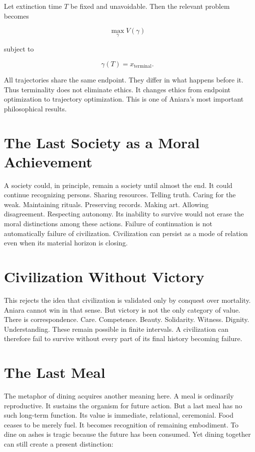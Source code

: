 \documentclass[11pt,oneside]{book}
\theoremstyle{definition}
\theoremstyle{remark}
\begin{document}
Let extinction time \(T\) be fixed and unavoidable. Then the relevant problem becomes

\[
\max_{\gamma} V(\gamma)
\]

subject to

\[
\gamma(T)=x_{\mathrm{terminal}}.
\]

All trajectories share the same endpoint. They differ in what happens before it. Thus terminality
does not eliminate ethics. It changes ethics from endpoint optimization to trajectory optimization.
This is one of Aniara's most important philosophical results.

\section{The Last Society as a Moral Achievement}

A society could, in principle, remain a society until almost the end. It could continue recognizing
persons. Sharing resources. Telling truth. Caring for the weak. Maintaining rituals. Preserving
records. Making art. Allowing disagreement. Respecting autonomy. Its inability to survive would not
erase the moral distinctions among these actions. Failure of continuation is not automatically
failure of civilization. Civilization can persist as a mode of relation even when its material
horizon is closing.

\section{Civilization Without Victory}

This rejects the idea that civilization is validated only by conquest over mortality. Aniara cannot
win in that sense. But victory is not the only category of value. There is correspondence. Care.
Competence. Beauty. Solidarity. Witness. Dignity. Understanding. These remain possible in finite
intervals. A civilization can therefore fail to survive without every part of its final history
becoming failure.

\section{The Last Meal}

The metaphor of dining acquires another meaning here. A meal is ordinarily reproductive. It sustains
the organism for future action. But a last meal has no such long-term function. Its value is
immediate, relational, ceremonial. Food ceases to be merely fuel. It becomes recognition of
remaining embodiment. To dine on ashes is tragic because the future has been consumed. Yet dining
together can still create a present distinction:
\end{document}
